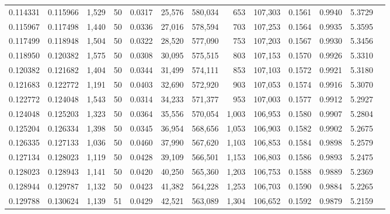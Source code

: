 \begin{tabular}{rrrrrrrrrrrrr}
0.114331 & 0.115966 & 1,529 &  50 &                                     0.0317 &  25,576 & 580,034 &     653 & 107,303 & 0.1561 & 0.9940 & 5.3729 \\
0.115967 & 0.117498 & 1,440 &  50 &                                     0.0336 &  27,016 & 578,594 &     703 & 107,253 & 0.1564 & 0.9935 & 5.3595 \\
0.117499 & 0.118948 & 1,504 &  50 &                                     0.0322 &  28,520 & 577,090 &     753 & 107,203 & 0.1567 & 0.9930 & 5.3456 \\
0.118950 & 0.120382 & 1,575 &  50 &                                     0.0308 &  30,095 & 575,515 &     803 & 107,153 & 0.1570 & 0.9926 & 5.3310 \\
0.120382 & 0.121682 & 1,404 &  50 &                                     0.0344 &  31,499 & 574,111 &     853 & 107,103 & 0.1572 & 0.9921 & 5.3180 \\
0.121683 & 0.122772 & 1,191 &  50 &                                     0.0403 &  32,690 & 572,920 &     903 & 107,053 & 0.1574 & 0.9916 & 5.3070 \\
0.122772 & 0.124048 & 1,543 &  50 &                                     0.0314 &  34,233 & 571,377 &     953 & 107,003 & 0.1577 & 0.9912 & 5.2927 \\
0.124048 & 0.125203 & 1,323 &  50 &                                     0.0364 &  35,556 & 570,054 &   1,003 & 106,953 & 0.1580 & 0.9907 & 5.2804 \\
0.125204 & 0.126334 & 1,398 &  50 &                                     0.0345 &  36,954 & 568,656 &   1,053 & 106,903 & 0.1582 & 0.9902 & 5.2675 \\
0.126335 & 0.127133 & 1,036 &  50 &                                     0.0460 &  37,990 & 567,620 &   1,103 & 106,853 & 0.1584 & 0.9898 & 5.2579 \\
0.127134 & 0.128023 & 1,119 &  50 &                                     0.0428 &  39,109 & 566,501 &   1,153 & 106,803 & 0.1586 & 0.9893 & 5.2475 \\
0.128023 & 0.128943 & 1,141 &  50 &                                     0.0420 &  40,250 & 565,360 &   1,203 & 106,753 & 0.1588 & 0.9889 & 5.2369 \\
0.128944 & 0.129787 & 1,132 &  50 &                                     0.0423 &  41,382 & 564,228 &   1,253 & 106,703 & 0.1590 & 0.9884 & 5.2265 \\
0.129788 & 0.130624 & 1,139 &  51 &                                     0.0429 &  42,521 & 563,089 &   1,304 & 106,652 & 0.1592 & 0.9879 & 5.2159 \\

\end{tabular}
